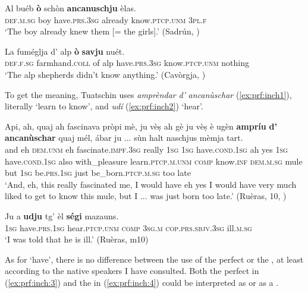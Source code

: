 \ea\label{ex:prf:schon}
\gll   Al buéb \textbf{ò} schòn \textbf{ancanuschju} èlas. \\
     \textsc{def.m.sg} boy have.\textsc{prs.3sg} already know.\textsc{ptcp.unm} \textsc{3pl.f}\\
\glt `The boy already knew them [= the girls].' (Sadrún, \citealt[103]{Büchli1966})
\z

\ea\label{ex:prf:inch:2}
\gll    La fuméglja d’ alp \textbf{ò} \textbf{savju} nuét.\\
     \textsc{def.f.sg} farmhand.\textsc{coll} of alp have.\textsc{prs.3sg} know.\textsc{ptcp.unm} nothing\\
\glt `The alp shepherds didn’t know anything.' (Cavòrgja, \citealt[53]{Büchli1966})
\z

To get the  meaning, Tuatschin uses \textit{amprèndar} \textit{d'} \textit{ancanùschar} (\ref{ex:prf:inch1}), literally `learn to know', and \textit{udí} (\ref{ex:prf:inch2}) `hear'.

\ea
\label{ex:prf:inch1}
\gll  Api, ah, quaj ah fascinava pròpi mè, ju vèṣ ah gè ju vèṣ è ugèn \textbf{ampríu} \textbf{d’} \textbf{ancanùschar} quaj mél, ábar ju ... sùn halt naschjus mèmja tart. \\
and eh \textsc{dem.unm} eh fascinate.\textsc{impf.3sg} really \textsc{1sg}  \textsc{1sg} have.\textsc{cond.1sg} ah yes \textsc{1sg} have.\textsc{cond.1sg} also with\_pleasure learn.\textsc{ptcp.m.unm} \textsc{comp} know.\textsc{inf} \textsc{dem.m.sg} mule but \textsc{1sg} {} be.\textsc{prs.1sg} just be\_born.\textsc{ptcp.m.sg} too late\\
\glt `And, eh, this really fascinated me, I would have eh yes I would have very much liked to get to know this mule, but I ... was just born too late.' (Ruèras, 10, )
\z

\ea
\label{ex:prf:inch2}
\gll Ju a \textbf{udju} tg' èl \textbf{ségi} mazauns.\\
\textsc{1sg} have.\textsc{prs.1sg} hear.\textsc{ptcp.unm} \textsc{comp} \textsc{3sg.m} \textsc{cop.prs.sbjv.3sg} ill.\textsc{m.sg}\\
\glt `I was told that he is ill.' (Ruèras, m10)
\z

As for  `have', there is no difference between the use of the perfect or the , at least according to the native speakers I have consulted. Both the perfect in (\ref{ex:prf:inch:3}) and the  in (\ref{ex:prf:inch:4}) could be interpreted as  or as a .

